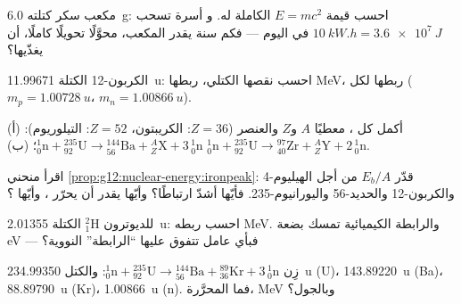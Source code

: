 \begin{exercise}[$\star$]\label{exo:g12:nuclear-energy:2}
مكعب سكر كتلته \qty{6.0}{g}: احسب قيمة $E = mc^2$ الكاملة له. و
أسرة تسحب $\qty{10}{kW.h} = \qty{3.6e7}{J}$ في اليوم --- فكم
سنة يقدر المكعب، محوَّلًا تحويلًا كاملًا، أن يغذّيها؟
\end{exercise}

\begin{exercise}[$\star$]\label{exo:g12:nuclear-energy:3}
 الكربون-12 الكتلة \qty{11.99671}{u}: احسب نقصها الكتلي،
 ربطها  \unit{MeV}،  ربطها لكل 
($m_p = \qty{1.00728}{u}$، $m_n = \qty{1.00866}{u}$).
\end{exercise}

\begin{exercise}[$\star$]\label{exo:g12:nuclear-energy:4}
أكمل كل ، معطيًا $A$ و$Z$ والعنصر ($Z = 36$: الكريبتون،
$Z = 52$: التيلوريوم):
(أ) ${}^{1}_{0}\mathrm{n} + {}^{235}_{92}\mathrm{U} \to
{}^{144}_{56}\mathrm{Ba} + {}^{A}_{Z}\mathrm{X} + 3\,{}^{1}_{0}\mathrm{n}$؛
(ب) ${}^{1}_{0}\mathrm{n} + {}^{235}_{92}\mathrm{U} \to
{}^{97}_{40}\mathrm{Zr} + {}^{A}_{Z}\mathrm{Y} + 2\,{}^{1}_{0}\mathrm{n}$.
\end{exercise}

\begin{exercise}[$\star$]\label{exo:g12:nuclear-energy:5}
اقرأ منحني \cref{prop:g12:nuclear-energy:ironpeak}: قدّر $E_b/A$ من أجل
الهيليوم-4 والكربون-12 والحديد-56 واليورانيوم-235. فأيّها أشدّ ارتباطًا؟
وأيّها يقدر أن يحرّر  ، وأيّها ؟
\end{exercise}

\begin{exercise}[$\star\star$]\label{exo:g12:nuclear-energy:6}
للديوترون ${}^{2}_{1}\mathrm{H}$ الكتلة \qty{2.01355}{u}: احسب
 ربطه  \unit{MeV}. والرابطة الكيميائية تمسك بضعة \unit{eV} --- فبأي
عامل تتفوق عليها ``الرابطة'' النووية؟
\end{exercise}

\begin{exercise}[$\star\star$]\label{exo:g12:nuclear-energy:7}
زِن  ${}^{1}_{0}\mathrm{n} + {}^{235}_{92}\mathrm{U} \to
{}^{144}_{56}\mathrm{Ba} + {}^{89}_{36}\mathrm{Kr} + 3\,{}^{1}_{0}\mathrm{n}$:
والكتل \qty{234.99350}{u} (U)، \qty{143.89220}{u} (Ba)، \qty{88.89790}{u}
(Kr)، \qty{1.00866}{u} (n). فما  المحرَّرة،  \unit{MeV} وبالجول؟
\end{exercise}

